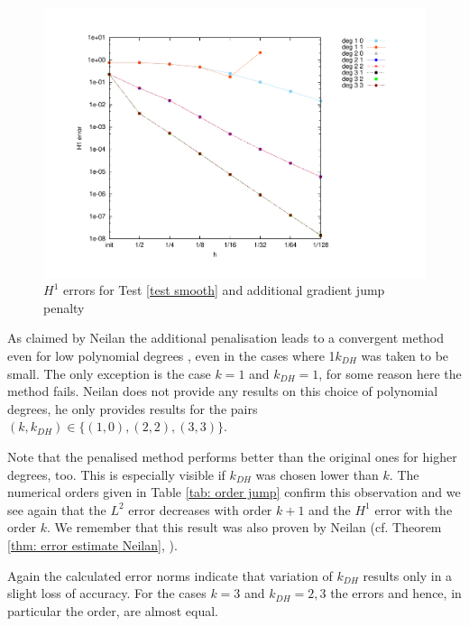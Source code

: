 \begin{figure}[H]
\centering
	\includegraphics[scale =0.45]{plots/MA1_Neilan_GradJump_h1.pdf}
	\caption{$H^1$ errors for Test \ref{test smooth} and additional gradient jump penalty}
	\label{fig: h1 errors test 1 jump}
\end{figure}

As claimed by Neilan the additional penalisation leads to a convergent method even for low polynomial degrees \cite[Section 5]{Neilan2014}, even in the cases where 1$k_{DH}$ was taken to be small. The only exception is the case $k=1$ and $k_{DH}=1$, for some reason here the method fails. Neilan does not provide any results on this choice of polynomial degrees, he only provides results for the pairs $(k,k_{DH}) \in \{(1,0), (2,2), (3,3)\}$. 

Note that the penalised method performs better than the original ones for higher degrees, too. This is especially visible if $k_{DH}$ was chosen lower than $k$. The numerical orders given in Table \ref{tab: order jump} confirm this observation and we see again that the $L^2$ error decreases with order $k+1$ and the $H^1$ error with the order $k$. We remember that this result was also proven by Neilan (cf. Theorem \ref{thm: error estimate Neilan}, \cite[Theorem 4.2.]{Neilan2014}).

Again the calculated error norms indicate that variation of $k_{DH}$ results only in a slight loss of accuracy. For the cases $k=3$ and $k_{DH} = 2,3$ the errors and hence, in particular the order, are almost equal. 


